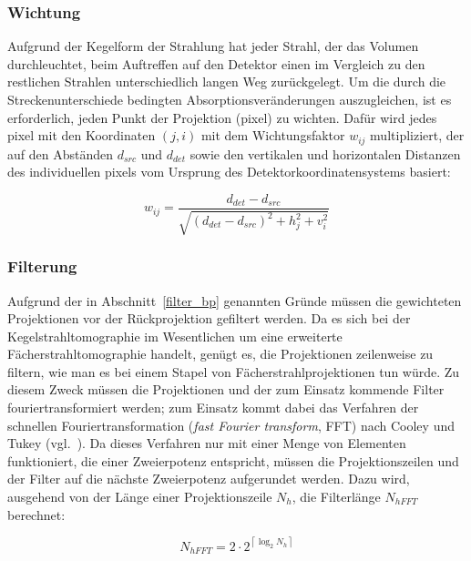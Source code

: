 \subsubsection{Wichtung}\label{sssec:fdk_wichtung}

Aufgrund der Kegelform der Strahlung hat jeder Strahl, der das Volumen durchleuchtet, beim Auftreffen auf den Detektor
einen im Vergleich zu den restlichen Strahlen unterschiedlich langen Weg zurückgelegt. Um die durch die
Streckenunterschiede bedingten Absorptionsveränderungen auszugleichen, ist es erforderlich, jeden Punkt der Projektion
(\gls{pixel}) zu wichten.
Dafür wird jedes \gls{pixel} mit den Koordinaten $(j, i)$ mit dem Wichtungsfaktor $w_{ij}$ multipliziert, der auf den
Abständen $d_{src}$ und $d_{det}$ sowie den vertikalen und horizontalen Distanzen des individuellen \gls{pixel}s vom
Ursprung des Detektorkoordinatensystems basiert:

\begin{equation}\label{eq:wichtung}
    w_{ij} = \frac{d_{det} - d_{src}}{\sqrt{(d_{det} - d_{src})^2 + h_j^2 + v_i^2}}
\end{equation}

\subsubsection{Filterung}\label{sssec:fdk_filter}

Aufgrund der in Abschnitt~\ref{filter_bp} genannten Gründe müssen die gewichteten Projektionen vor der Rückprojektion
gefiltert werden. Da es sich bei der Kegelstrahltomographie im Wesentlichen um eine erweiterte Fächerstrahltomographie
handelt, genügt es, die Projektionen zeilenweise zu filtern, wie man es bei einem {\glqq}Stapel{\grqq} von
Fächerstrahlprojektionen tun würde. Zu diesem Zweck müssen die Projektionen und der zum Einsatz kommende Filter
fouriertransformiert werden; zum Einsatz kommt dabei das Verfahren der schnellen Fouriertransformation (\textit{fast
Fourier transform}, FFT) nach Cooley und Tukey (vgl.~\cite{cooltuk}). Da dieses Verfahren nur mit einer Menge von
Elementen funktioniert, die einer Zweierpotenz entspricht, müssen die Projektionszeilen und der Filter auf die nächste
Zweierpotenz {\glqq}aufgerundet{\grqq} werden. Dazu wird, ausgehend von der Länge einer Projektionszeile $N_h$, die
Filterlänge $N_{hFFT}$ berechnet:

\begin{equation}
    N_{hFFT} = 2 \cdot 2^{\left\lceil \log_{2} N_h \right\rceil}
\end{equation}


